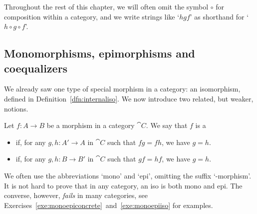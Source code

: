 \begin{notation}
Throughout the rest of this chapter, we will often omit the symbol $\circ$ for composition within a category, and we write strings like `$hgf$' as shorthand for `$h \circ g \circ f$'.
\end{notation}

\subsection*{Monomorphisms, epimorphisms and coequalizers}
We already saw one type of special morphism in a category: an isomorphism, defined in  Definition~\ref{dfn:internaliso}. We now introduce two related, but weaker, notions.
\begin{definition}
Let $f \colon A \to B$ be a morphism in a category $\cat{C}$. We say that $f$ is a 
\begin{itemize}
\item {} if, for any $g, h \colon A' \to A$ in $\cat{C}$ such that $fg = fh$, we have $g = h$.
\item {} if, for any $g, h \colon B \to B'$ in $\cat{C}$ such that $gf = hf$, we have $g = h$.
\end{itemize}
\end{definition}
We often use the abbreviations `mono' and `epi', omitting the suffix `-morphism'. 
It is not hard to prove that in any category, an iso is both mono and epi. The converse, however, \emph{fails} in many categories, see Exercises~\ref{exe:monoepiconcrete}~and~\ref{exe:monoepiiso} for examples.

